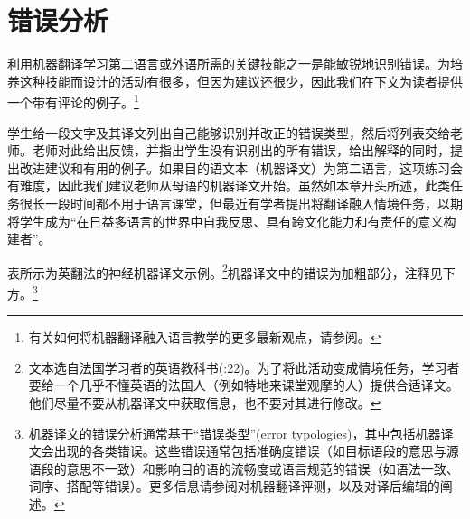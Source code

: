 \documentclass[output=paper,colorlinks,citecolor=brown]{langscibook}
\begin{document}
\section{错误分析}
利用机器翻译学习第二语言或外语所需的关键技能之一是能敏锐地识别错误。为培养这种技能而设计的活动有很多，但因为建议还很少，因此我们在下文为读者提供一个带有评论的例子。\footnote{有关如何将机器翻译融入语言教学的更多最新观点，请参阅\citet{VinallHellmich2022}。}

学生给一段文字及其译文列出自己能够识别并改正的错误类型，然后将列表交给老师。老师对此给出反馈，并指出学生没有识别出的所有错误，给出解释的同时，提出改进建议和有用的例子。如果目的语文本（机器译文）为第二语言，这项练习会有难度，因此我们建议老师从母语的机器译文开始。虽然如本章开头所述，此类任务很长一段时间都不用于语言课堂，但最近有学者提出将翻译融入情境任务，以期将学生成为“在日益多语言的世界中自我反思、具有跨文化能力和有责任的意义构建者”\citep[105]{Laviosa2014}。

表所示为英翻法的神经机器译文示例。\footnote{文本选自法国学习者的英语教科书(\citealt{Joyeux2019}:22)。为了将此活动变成情境任务，学习者要给一个几乎不懂英语的法国人（例如特地来课堂观摩的人）提供合适译文。他们尽量不要从机器译文中获取信息，也不要对其进行修改。}机器译文中的错误为加粗部分，注释见下方。\footnote{机器译文的错误分析通常基于“错误类型”(error typologies)，其中包括机器译文会出现的各类错误。这些错误通常包括准确度错误（如目标语段的意思与源语段的意思不一致）和影响目的语的流畅度或语言规范的错误（如语法一致、词序、搭配等错误）。更多信息请参阅对机器翻译评测，以及对译后编辑的阐述。}
\end{document}
